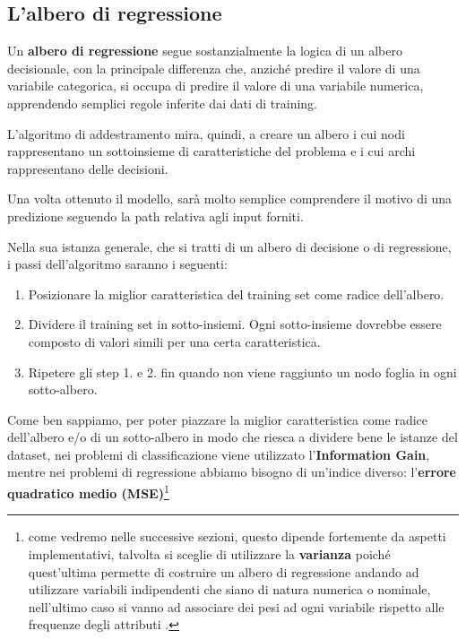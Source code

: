 \documentclass[a4paper, 11pt, oneside]{report}
\begin{document}
                \subsection{L'albero di regressione}
                Un \textbf{albero di regressione} segue sostanzialmente la logica di un albero decisionale, con la principale
                differenza che, anziché predire il valore di una variabile categorica, si occupa di predire il valore di
                una variabile numerica, apprendendo semplici regole inferite dai dati di training.
                \par \noindent L'algoritmo di addestramento mira, quindi, a creare un albero i cui nodi rappresentano un sottoinsieme
                di caratteristiche del problema e i cui archi rappresentano delle decisioni.
                \par \noindent Una volta ottenuto il modello, sarà molto semplice comprendere il motivo di una predizione
                seguendo la path relativa agli input forniti.\\
                \par \noindent Nella sua istanza generale, che si tratti di un albero di decisione o di regressione, i
                passi dell'algoritmo saranno i seguenti:
                \begin{enumerate}
                    \item Posizionare la miglior caratteristica del training set come radice dell'albero.
                    \item Dividere il training set in sotto-insiemi. Ogni sotto-insieme dovrebbe essere composto di valori
                    simili per una certa caratteristica.
                    \item Ripetere gli step 1. e 2. fin quando non viene raggiunto un nodo foglia in ogni sotto-albero.
                \end{enumerate}
                \medskip
                \par \noindent Come ben sappiamo, per poter piazzare la miglior caratteristica come radice dell'albero e/o
                di un sotto-albero in modo che riesca a dividere bene le istanze del dataset, nei problemi di classificazione
                viene utilizzato l'\textbf{Information Gain}, mentre nei problemi di regressione abbiamo bisogno di un'indice
                diverso: l'\textbf{errore quadratico medio (MSE)}\footnote{come vedremo nelle
                successive sezioni, questo dipende fortemente da aspetti implementativi, talvolta si sceglie di utilizzare
                la \textbf{varianza} poiché quest'ultima permette di costruire un albero di regressione andando ad utilizzare
                variabili indipendenti che siano di natura numerica o nominale, nell'ultimo caso si vanno ad associare dei
                pesi ad ogni variabile rispetto alle frequenze degli attributi \cite{8}.}
\end{document}

